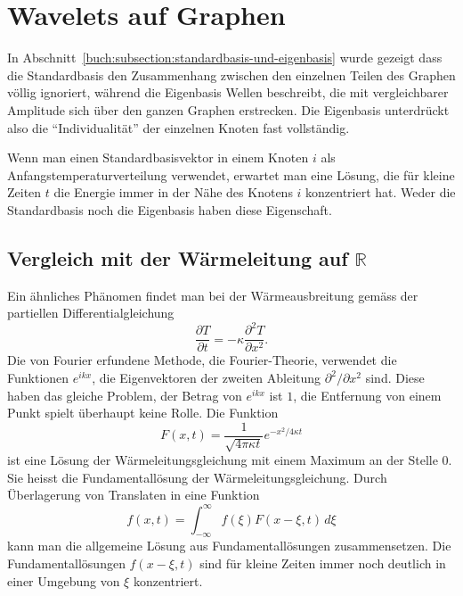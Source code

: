 %
%
%
\section{Wavelets auf Graphen
\label{buch:section:wavelets-auf-graphen}}
In Abschnitt~\ref{buch:subsection:standardbasis-und-eigenbasis} wurde
gezeigt dass die Standardbasis den Zusammenhang zwischen den einzelnen
Teilen des Graphen völlig ignoriert, während die Eigenbasis Wellen
beschreibt, die mit vergleichbarer Amplitude sich über den ganzen
Graphen erstrecken.
Die Eigenbasis unterdrückt also die ``Individualität'' der einzelnen
Knoten fast vollständig.

Wenn man einen Standardbasisvektor in einem Knoten $i$
als Anfangstemperaturverteilung verwendet, erwartet man eine Lösung,
die für kleine Zeiten $t$ die Energie immer in der Nähe des Knotens $i$
konzentriert hat.
Weder die Standardbasis noch die Eigenbasis haben diese Eigenschaft.

\subsection{Vergleich mit der Wärmeleitung auf $\mathbb{R}$}
Ein ähnliches Phänomen findet man bei der Wärmeausbreitung gemäss
der partiellen Differentialgleichung
\[
\frac{\partial T}{\partial t} = -\kappa \frac{\partial^2 T}{\partial x^2}.
\]
Die von Fourier erfundene Methode, die Fourier-Theorie, verwendet die
Funktionen $e^{ik x}$, die Eigenvektoren der zweiten Ableitung
$\partial^2/\partial x^2$ sind.
Diese haben das gleiche Problem, der Betrag von $e^{ikx}$ ist $1$, die
Entfernung von einem Punkt spielt überhaupt keine Rolle.
Die Funktion
\[
F(x,t)
=
\frac{1}{\sqrt{4\pi\kappa t}}e^{-x^2/4\kappa t}
\]
ist eine Lösung der Wärmeleitungsgleichung mit einem Maximum an
der Stelle $0$.
Sie heisst die Fundamentallösung der Wärmeleitungsgleichung.
Durch Überlagerung von Translaten in eine Funktion
\begin{equation}
f(x,t)
=
\int_{-\infty}^\infty f(\xi) F(x-\xi,t)\,d\xi
\label{buch:graphen:eqn:fundamentalueberlagerung}
\end{equation}
kann man die allgemeine Lösung aus Fundamentallösungen zusammensetzen.
Die Fundamentallösungen $f(x-\xi,t)$ sind für kleine Zeiten immer noch
deutlich in einer Umgebung von $\xi$ konzentriert.

